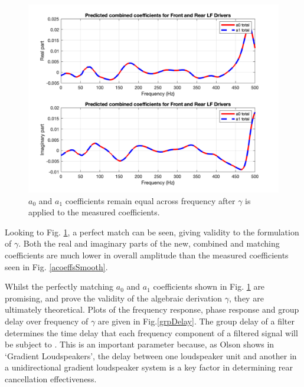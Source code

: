 \documentclass{report}
\begin{document}
            \begin{figure}[H]
                \centering
                \includegraphics[scale=0.35]{figs/coeffsPredicted.png}%
                \caption{$a_0$ and $a_1$ coefficients remain equal across frequency after $\gamma$ is applied to the measured coefficients.}
                \label{coeffsPredicted}
            \end{figure}

            Looking to Fig. \ref{coeffsPredicted}, a perfect match can be seen, giving validity to the formulation of $\gamma$.
            Both the real and imaginary parts of the new, combined and matching coefficients are much lower in overall amplitude than the measured coefficients seen in Fig. \ref{acoeffsSmooth}.

            Whilst the perfectly matching $a_0$ and $a_1$ coefficients shown in Fig. \ref{coeffsPredicted} are promising, and prove the validity of the algebraic derivation $\gamma$, they are ultimately theoretical.
            Plots of the frequency response, phase response and group delay over frequency of $\gamma$ are given in Fig.\ref{grpDelay}.
            The group delay of a filter determines the time delay that each frequency component of a filtered signal will be subject to \cite{oppenheim1999discrete} \cite{rabiner1975theory}.
            This is an important parameter because, as Olson shows in `Gradient Loudspeakers', the delay between one loudspeaker unit and another in a unidirectional gradient loudspeaker system is a key factor in determining rear cancellation effectiveness.
\end{document}
